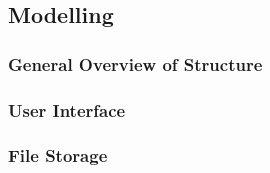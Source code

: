\begin{FlushLeft}
        \subsection{Modelling}
            \subsubsection{General Overview of Structure}
            \BK

            \subsubsection{User Interface}
            \BK

            \subsubsection{File Storage}
            \BK
        \bk

\end{FlushLeft}